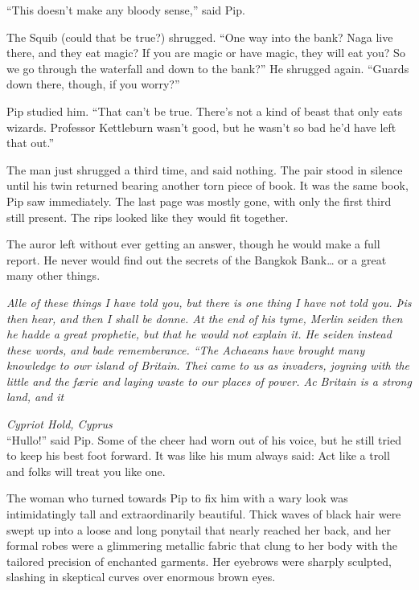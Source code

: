 ``This doesn't make any bloody sense,'' said Pip.

The Squib (could that be true?) shrugged. ``One way into the bank? Naga
live there, and they eat magic? If you are magic or have magic, they
will eat you? So we go through the waterfall and down to the bank?'' He
shrugged again. ``Guards down there, though, if you worry?''

Pip studied him. ``That can't be true. There's not a kind of beast that
only eats wizards. Professor Kettleburn wasn't good, but he wasn't so
bad he'd have left that out.''

The man just shrugged a third time, and said nothing. The pair stood in
silence until his twin returned bearing another torn piece of book. It
was the same book, Pip saw immediately. The last page was mostly gone,
with only the first third still present. The rips looked like they would
fit together.

The auror left without ever getting an answer, though he would make a
full report. He never would find out the secrets of the Bangkok
Bank\ldots{} or a great many other things.

\mybreak

\emph{Alle of these things I have told you, but there is one thing I
have not told you. Þis then hear, and then I shall be donne. At the end
of his tyme, Merlin seiden then he hadde a great prophetie, but that he
would not explain it. He seiden instead these words, and bade
rememberance. ``The Achaeans have brought many knowledge to owr island
of Britain. Thei came to us as invaders, joyning with the little and the
færie and laying waste to our places of power. Ac Britain is a strong
land, and it}

\mybreak

\emph{Cypriot Hold, Cyprus}\\

``Hullo!'' said Pip. Some of the cheer had worn out of his voice, but he
still tried to keep his best foot forward. It was like his mum always
said: Act like a troll and folks will treat you like one.

The woman who turned towards Pip to fix him with a wary look was
intimidatingly tall and extraordinarily beautiful. Thick waves of black
hair were swept up into a loose and long ponytail that nearly reached
her back, and her formal robes were a glimmering metallic fabric that
clung to her body with the tailored precision of enchanted garments. Her
eyebrows were sharply sculpted, slashing in skeptical curves over
enormous brown eyes.

